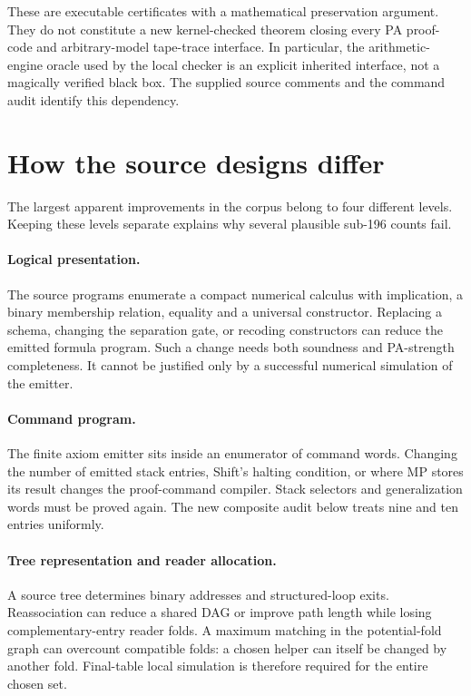 \documentclass[11pt,a4paper]{article}
\begin{document}
These are executable certificates with a mathematical preservation
argument. They do not constitute a new kernel-checked theorem closing
every PA proof-code and arbitrary-model tape-trace interface. In
particular, the arithmetic-engine oracle used by the local checker is
an explicit inherited interface, not a magically verified black box.
The supplied source comments and the command audit identify this
dependency.

\section{How the source designs differ}

The largest apparent improvements in the corpus belong to four
different levels. Keeping these levels separate explains why several
plausible sub-196 counts fail.

\paragraph{Logical presentation.}
The source programs enumerate a compact numerical calculus with
implication, a binary membership relation, equality and a universal
constructor. Replacing a schema, changing the separation gate, or
recoding constructors can reduce the emitted formula program. Such a
change needs both soundness and PA-strength completeness. It cannot
be justified only by a successful numerical simulation of the emitter.

\paragraph{Command program.}
The finite axiom emitter sits inside an enumerator of command words.
Changing the number of emitted stack entries, Shift's halting condition,
or where MP stores its result changes the proof-command compiler.
Stack selectors and generalization words must be proved again. The
new composite audit below treats nine and ten entries uniformly.

\paragraph{Tree representation and reader allocation.}
A source tree determines binary addresses and structured-loop exits.
Reassociation can reduce a shared DAG or improve path length while
losing complementary-entry reader folds. A maximum matching in the
potential-fold graph can overcount compatible folds: a chosen helper
can itself be changed by another fold. Final-table local simulation
is therefore required for the entire chosen set.
\end{document}
